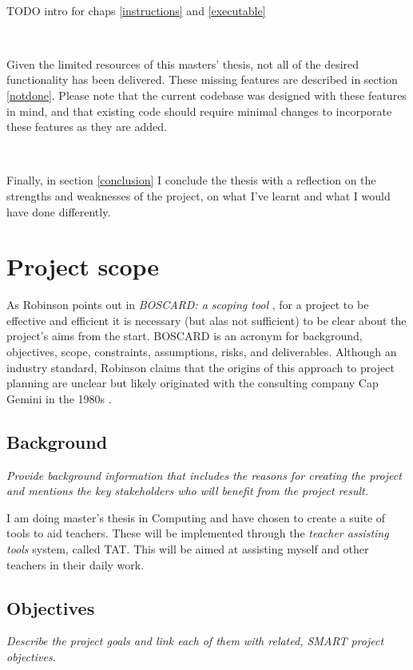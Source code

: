 \documentclass[10pt]{article}
\begin{document}
\

TODO intro for chaps \ref{instructions} and \ref{executable}

\

Given the limited resources of this masters' thesis, not all of the desired functionality has been delivered. These missing features are described in section \ref{notdone}. Please note that the current codebase was designed with these features in mind, and that existing code should require minimal changes to incorporate these features as they are added.

\

Finally, in section \ref{conclusion} I conclude the thesis with a reflection on the strengths and weaknesses of the project, on what I've learnt and what I would have done differently.

\section{Project scope}

As Robinson points out in \emph{BOSCARD: a scoping tool} \cite{Rob19}, for a project to be effective and efficient it is necessary (but alas not sufficient) to be clear about the project's aims from the start. BOSCARD is an acronym for background, objectives, scope, constraints, assumptions, risks, and deliverables. Although an industry standard, Robinson claims that the origins of this approach to project planning are unclear but likely originated with the consulting company Cap Gemini in the 1980s \cite[p. 181]{Rob19}.

\subsection{Background}
\emph{Provide background information that includes the reasons for creating the project and mentions the key stakeholders who will benefit from the project result.}

I am doing master's thesis in Computing and have chosen to create a suite of tools to aid teachers. These will be implemented through the \emph{teacher assisting tools} system, called TAT. This will be aimed at assisting  myself and other teachers in their daily work.

\subsection{Objectives} 
\emph{Describe the project goals and link each of them with related, SMART project objectives.}
\end{document}
